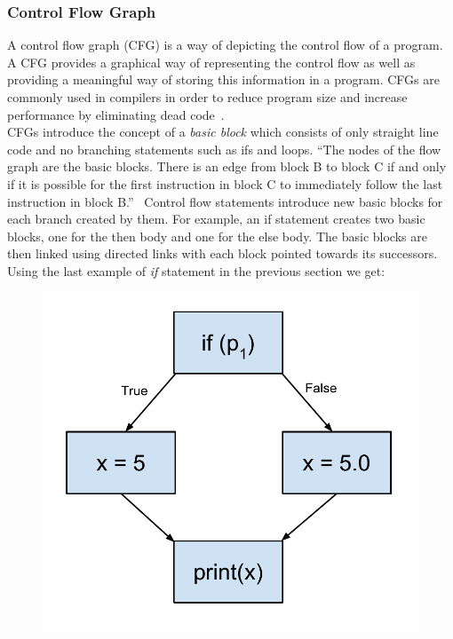 \documentclass[12pt, titlepage]{article}
\begin{document}
\subsubsection{Control Flow Graph}
A control flow graph (CFG) is a way of depicting the control flow of a program. A CFG provides a graphical way of representing the control flow as well as providing a meaningful way of storing this information in a program. CFGs are commonly used in compilers in order to reduce program size and increase performance by eliminating dead code~\cite{dragonBook}. \\
\indent CFGs introduce the concept of a \textit{basic block} which consists of only straight line code and no branching statements such as ifs and loops. ``The nodes of the flow 
graph are the basic blocks. There is an edge from block B to block C if and 
only if it is possible for the first instruction in block C to immediately follow 
the last instruction in block B.''~\cite{dragonBook} Control flow statements introduce new basic blocks for each branch created by them. For example, an if statement creates two basic blocks, one for the then body and one for the else body. The basic blocks are then linked using directed links with each block pointed towards its successors. \\
\indent Using the last example of \textit{if} statement in the previous section we get:
\begin{figure}[h]
\centering
\includegraphics[scale=0.4]{images/controlFlowGraph.pdf}
\end{figure}  \\
\end{document}
